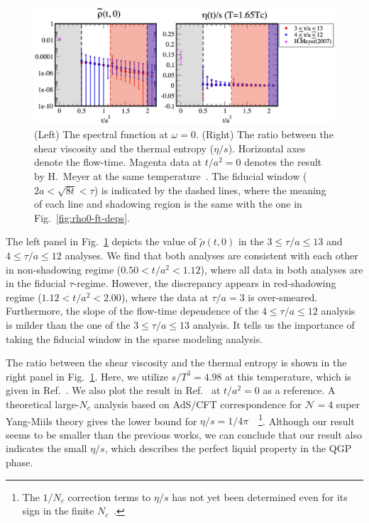 \documentclass[a4paper,11pt]{article}
\begin{document}
\begin{figure}[h]
\begin{center}
\includegraphics[scale=0.25]{./rho0-eta-with-shadow.pdf}
\caption{ (Left) The spectral function at $\omega=0$. (Right) The ratio between the shear viscosity and the thermal entropy ($\eta/s$). 
Horizontal axes denote the flow-time. Magenta data at $t/a^2=0$ denotes the result by H.~Meyer at the same temperature~\cite{Meyer:2007ic}.
The fiducial window ($2a < \sqrt{8t} < \tau$)  is indicated by the dashed lines, where the meaning of each line and shadowing region is the same with the one in Fig.~\ref{fig:rho0-ft-deps}.   }
\label{fig:rho0-eta}
\end{center}
\end{figure}
The left panel in Fig.~\ref{fig:rho0-eta} depicts the value of $\tilde{\rho}(t,0)$ in the $3 \le \tau/a \le 13$ and $4 \le \tau/a \le 12$ analyses.
We find that both analyses are consistent with each other
in non-shadowing regime ($0.50 < t/a^2 < 1.12$), where all data in both analyses are in the fiducial $\tau$-regime.
However, the discrepancy appears in red-shadowing regime ($1.12 < t/a^2 < 2.00$), where the data at $\tau/a=3$ is over-smeared.
Furthermore, the slope of the flow-time dependence of the $4 \le \tau/a \le 12$ analysis is milder than the one of the $3 \le \tau/a \le13$ analysis.
It tells us the importance of taking the fiducial window in the sparse modeling analysis.

The ratio between the shear viscosity and the thermal entropy is shown in the right panel in Fig.~\ref{fig:rho0-eta}.
Here, we utilize $s/T^3=4.98$ at this temperature, which is given in Ref.~\cite{Asakawa:2013laa}.
We also plot the result in Ref.~\cite{Meyer:2007ic} at $t/a^2=0$ as a reference.
A theoretical large-$N_c$ analysis based on AdS/CFT correspondence for ${\mathcal N}=4$ super Yang-Miils theory gives the lower bound for $\eta/s=1/4\pi$~\cite{Son:2007vk}~\footnote{The $1/N_c$ correction terms to $\eta/s$ has not yet been determined even for its sign in the finite $N_c$~\cite{Kats:2007mq}.}.
Although our result seems to be smaller than the previous works, we can conclude that our result also indicates the small $\eta/s$, which describes the perfect liquid property in the QGP phase.
\end{document}
